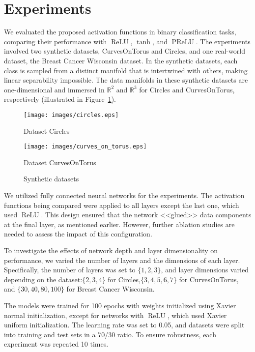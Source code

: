 \documentclass{esannV2}
\DeclareMathOperator{\relu}{\mathrm{ReLU}}
\DeclareMathOperator{\prelu}{\mathrm{PReLU}}
\begin{document}
\section{Experiments}

We evaluated the proposed activation functions in binary classification tasks, comparing their performance with \( \relu \), $\tanh$, and \( \prelu \). The experiments involved two synthetic datasets, CurvesOnTorus and Circles, and one real-world dataset, the Breast Cancer Wisconsin dataset. In the synthetic datasets, each class is sampled from a distinct manifold that is intertwined with others, making linear separability impossible. The data manifolds in these synthetic datasets are one-dimensional and immersed in $\mathbb{R}^2$ and $\mathbb{R}^3$ for Circles and CurvesOnTorus, respectively (illustrated in Figure~\ref{fig:data_manifolds}).

\begin{figure}[!htb]
  \texttt{[image: images/circles.eps]}
  \caption{Dataset Circles}
  \endminipage\hfill
  \texttt{[image: images/curves\_on\_torus.eps]}
  \caption{Dataset CurvesOnTorus}
  \endminipage
  \caption{Synthetic datasets}
  \label{fig:data_manifolds}
\end{figure}

We utilized fully connected neural networks for the experiments. The activation functions being compared were applied to all layers except the last one, which used \( \relu \). This design ensured that the network <<glued>> data components at the final layer, as mentioned earlier. However, further ablation studies are needed to assess the impact of this configuration.

To investigate the effects of network depth and layer dimensionality on performance, we varied the number of layers and the dimensions of each layer. Specifically, the number of layers was set to $\{1, 2, 3\}$, and layer dimensions varied depending on the dataset:$\{2, 3, 4\}$ for Circles,$\{3, 4, 5, 6, 7\}$ for CurvesOnTorus, and $\{30, 40, 80, 100\}$ for Breast Cancer Wisconsin.

The models were trained for 100 epochs with weights initialized using Xavier normal initialization, except for networks with \( \relu \), which used Xavier uniform initialization. The learning rate was set to 0.05, and datasets were split into training and test sets in a 70/30 ratio. To ensure robustness, each experiment was repeated 10 times.
\end{document}
